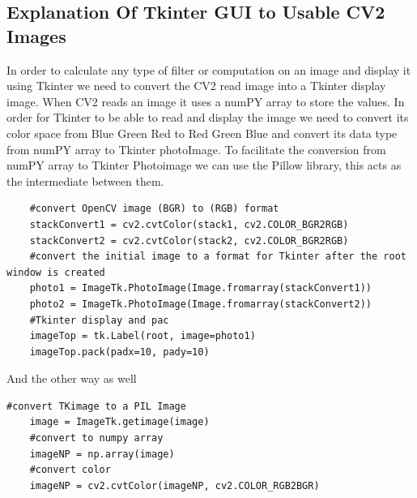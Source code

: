 \subsection{Explanation Of Tkinter GUI to Usable CV2 Images}
In order to calculate any type of filter or computation on an image and display it using Tkinter we need to convert the CV2 read image into a Tkinter display image. When CV2 reads an image it uses a numPY array to store the values. In order for Tkinter to be able to read and display the image we need to convert its color space from Blue Green Red to Red Green Blue and convert its data type from numPY array to Tkinter photoImage. To facilitate the conversion from numPY array to Tkinter Photoimage we can use the Pillow library, this acts as the intermediate between them.
\begin{verbatim}
    #convert OpenCV image (BGR) to (RGB) format
    stackConvert1 = cv2.cvtColor(stack1, cv2.COLOR_BGR2RGB)
    stackConvert2 = cv2.cvtColor(stack2, cv2.COLOR_BGR2RGB)
    #convert the initial image to a format for Tkinter after the root window is created
    photo1 = ImageTk.PhotoImage(Image.fromarray(stackConvert1))
    photo2 = ImageTk.PhotoImage(Image.fromarray(stackConvert2))
    #Tkinter display and pac
    imageTop = tk.Label(root, image=photo1)
    imageTop.pack(padx=10, pady=10)
\end{verbatim}
And the other way as well
\begin{verbatim}
#convert TKimage to a PIL Image
    image = ImageTk.getimage(image)
    #convert to numpy array
    imageNP = np.array(image)
    #convert color
    imageNP = cv2.cvtColor(imageNP, cv2.COLOR_RGB2BGR)
\end{verbatim}


